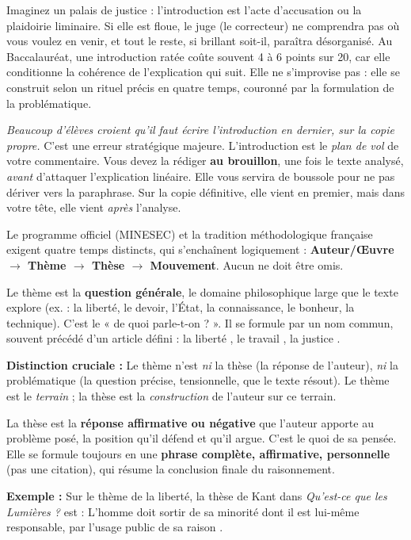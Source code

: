 \documentclass[11pt]{article}
\newcommand{\cle}[1]{{\popxbold\color{popdark}#1}}
\newcounter{popsec}
\newcounter{popsub}
\newcommand{\courssub}[1]{%
  \stepcounter{popsub}%
  \par\vspace{9pt}\noindent{\popxbold\fontsize{11.5}{13}\selectfont\color{popink}{\color{poporange}\thepopsec.\thepopsub}\hspace{6pt}#1}\par\nopagebreak\vspace{4pt}
}
\begin{document}
Imaginez un palais de justice : l'introduction est l'acte d'accusation ou la plaidoirie liminaire. Si elle est floue, le juge (le correcteur) ne comprendra pas où vous voulez en venir, et tout le reste, si brillant soit-il, paraîtra désorganisé. Au Baccalauréat, une introduction ratée coûte souvent 4 à 6 points sur 20, car elle conditionne la cohérence de l'explication qui suit. Elle ne s'improvise pas : elle se \cle{construit} selon un rituel précis en quatre temps, couronné par la formulation de la \cle{problématique}.

\begin{savaistu}
\emph{Beaucoup d'élèves croient qu'il faut écrire l'introduction en dernier, sur la copie propre.} C'est une erreur stratégique majeure. L'introduction est le \emph{plan de vol} de votre commentaire. Vous devez la rédiger \textbf{au brouillon}, une fois le texte analysé, \emph{avant} d'attaquer l'explication linéaire. Elle vous servira de boussole pour ne pas dériver vers la paraphrase. Sur la copie définitive, elle vient en premier, mais dans votre tête, elle vient \emph{après} l'analyse.
\end{savaistu}

\courssub{Les quatre temps codifiés de l'introduction}

Le programme officiel (MINESEC) et la tradition méthodologique française exigent quatre temps distincts, qui s'enchaînent logiquement : \textbf{Auteur/Œuvre $\rightarrow$ Thème $\rightarrow$ Thèse $\rightarrow$ Mouvement}. Aucun ne doit être omis.

\begin{definition}
Le \cle{thème} est la \textbf{question générale}, le domaine philosophique large que le texte explore (ex. : la liberté, le devoir, l'État, la connaissance, le bonheur, la technique). C'est le « de quoi parle-t-on ? ». Il se formule par un nom commun, souvent précédé d'un article défini : \guillemotleft la liberté \guillemotright, \guillemotleft le travail \guillemotright, \guillemotleft la justice \guillemotright.
\par \textbf{Distinction cruciale :} Le thème n'est \emph{ni} la thèse (la réponse de l'auteur), \emph{ni} la problématique (la question précise, tensionnelle, que le texte résout). Le thème est le \emph{terrain} ; la thèse est la \emph{construction} de l'auteur sur ce terrain.
\end{definition}

\begin{definition}[La thèse]
La \cle{thèse} est la \textbf{réponse affirmative ou négative} que l'auteur apporte au problème posé, la position qu'il défend et qu'il argue. C'est le \guillemotleft quoi \guillemotright de sa pensée. Elle se formule toujours en une \textbf{phrase complète, affirmative, personnelle} (pas une citation), qui résume la conclusion finale du raisonnement.
\par \textbf{Exemple :} Sur le thème de la liberté, la thèse de Kant dans \emph{Qu'est-ce que les Lumières ?} est : \guillemotleft L'homme doit sortir de sa minorité dont il est lui-même responsable, par l'usage public de sa raison \guillemotright.
\end{definition}
\end{document}
